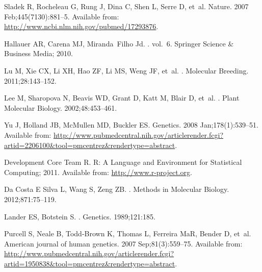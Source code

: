 \documentclass[10pt,letterpaper]{article}
\begin{document}
\begin{thebibliography}{10}
Sladek R, Rocheleau G, Rung J, Dina C, Shen L, Serre D, et~al.
\newblock Nature. 2007 Feb;445(7130):881--5.
\newblock Available from: \url{http://www.ncbi.nlm.nih.gov/pubmed/17293876}.

Hallauer AR, Carena MJ, Miranda~Filho Jd.
. vol.~6.
\newblock Springer Science \& Business Media; 2010.

Lu M, Xie CX, Li XH, Hao ZF, Li MS, Weng JF, et~al.
.
\newblock Molecular Breeding. 2011;28:143--152.

Lee M, Sharopova N, Beavis WD, Grant D, Katt M, Blair D, et~al.
.
\newblock Plant Molecular Biology. 2002;48:453--461.

Yu J, Holland JB, McMullen MD, Buckler ES.
\newblock Genetics. 2008 Jan;178(1):539--51.
\newblock Available from:
  \url{http://www.pubmedcentral.nih.gov/articlerender.fcgi?artid=2206100\&tool=pmcentrez\&rendertype=abstract}.

{Development Core Team} R. {R: A Language and Environment for Statistical
  Computing}; 2011.
\newblock Available from: \url{http://www.r-project.org}.

{Da Costa E  Silva} L, Wang S, Zeng ZB.
.
\newblock Methods in Molecular Biology. 2012;871:75--119.

Lander ES, Botstein S.
.
\newblock Genetics. 1989;121:185.

Purcell S, Neale B, Todd-Brown K, Thomas L, Ferreira MaR, Bender D, et~al.
\newblock American journal of human genetics. 2007 Sep;81(3):559--75.
\newblock Available from:
  \url{http://www.pubmedcentral.nih.gov/articlerender.fcgi?artid=1950838\&tool=pmcentrez\&rendertype=abstract}.


\end{thebibliography}
\end{document}
